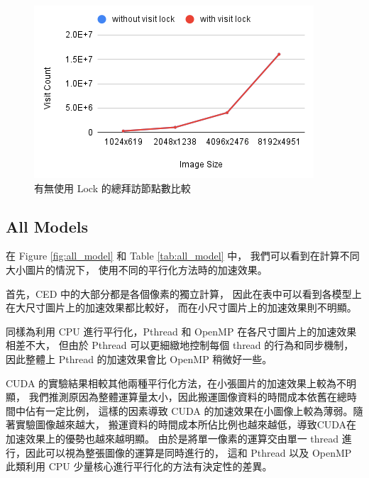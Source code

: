 \documentclass[sigconf,nonacm]{acmart}
\begin{document}
\begin{figure}
  \centering
  \includegraphics[width=\linewidth]{"./image/openmp_visit_count.png"}
  \caption{有無使用 Lock 的總拜訪節點數比較}
  \label{fig:openmp_visit_count}
\end{figure}

\subsection{All Models}

在 Figure \ref{fig:all_model} 和 Table \ref{tab:all_model} 中，
我們可以看到在計算不同大小圖片的情況下，
使用不同的平行化方法時的加速效果。

首先，CED 中的大部分都是各個像素的獨立計算，
因此在表中可以看到各模型上在大尺寸圖片上的加速效果都比較好，
而在小尺寸圖片上的加速效果則不明顯。

同樣為利用 CPU 進行平行化，Pthread 和 OpenMP 在各尺寸圖片上的加速效果相差不大，
但由於 Pthread 可以更細緻地控制每個 thread 的行為和同步機制，
因此整體上 Pthread 的加速效果會比 OpenMP 稍微好一些。

CUDA 的實驗結果相較其他兩種平行化方法，在小張圖片的加速效果上較為不明顯，
我們推測原因為整體運算量太小，因此搬運圖像資料的時間成本依舊在總時間中佔有一定比例，
這樣的因素導致 CUDA 的加速效果在小圖像上較為薄弱。隨著實驗圖像越來越大，
搬運資料的時間成本所佔比例也越來越低，導致CUDA在加速效果上的優勢也越來越明顯。
由於是將單一像素的運算交由單一 thread 進行，因此可以視為整張圖像的運算是同時進行的，
這和 Pthread 以及 OpenMP 此類利用 CPU 少量核心進行平行化的方法有決定性的差異。
\end{document}
